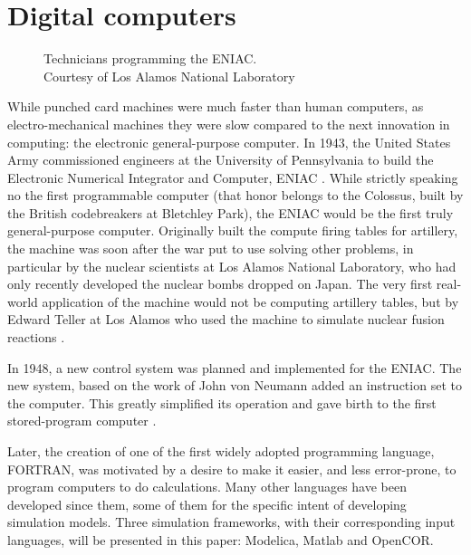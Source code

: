 \documentclass[\rootfolder/main.tex]{subfiles}
\begin{document}
\section{Digital computers}

\begin{wrapfigure}{R}{0.6\columnwidth}
    \caption[Technicians programming the ENIAC]
            {Technicians programming the ENIAC. \\ Courtesy of Los Alamos National Laboratory\label{fig:eniac}}
\end{wrapfigure}

While punched card machines were much faster than human computers, as electro-mechanical machines they were slow compared to the next innovation in computing: the electronic general-purpose computer.
In 1943, the United States Army commissioned engineers at the University of Pennsylvania to build the Electronic Numerical Integrator and Computer, ENIAC \cite{sep-computing-history}\cite{reed1952}.
While strictly speaking no the first programmable computer (that honor belongs to the Colossus, built by the British codebreakers at Bletchley Park\cite{winegrad1996}), the ENIAC would be the first truly general-purpose computer.
Originally built the compute firing tables for artillery, the machine was soon after the war put to use solving other problems, in particular by the nuclear scientists at Los Alamos National Laboratory, who had only recently developed the nuclear bombs dropped on Japan.
The very first real-world application of the machine would not be computing artillery tables, but by Edward Teller at Los Alamos who used the machine to simulate nuclear fusion reactions \cite{AtomicHeritageFoundation}.

In 1948, a new control system was planned and implemented for the ENIAC.
The new system, based on the work of John von Neumann \cite{VonNeumann1993} \cite{Haigh2014a} added an instruction set to the computer.
This greatly simplified its operation and gave birth to the first stored-program computer \cite{Rope2007}.

Later, the creation of one of the first widely adopted programming language, FORTRAN, was motivated by a desire to make it easier, and less error-prone, to program computers to do calculations.
Many other languages have been developed since them, some of them for the specific intent of developing simulation models.
Three simulation frameworks, with their corresponding input languages, will be presented in this paper: Modelica, Matlab and OpenCOR.
\end{document}
